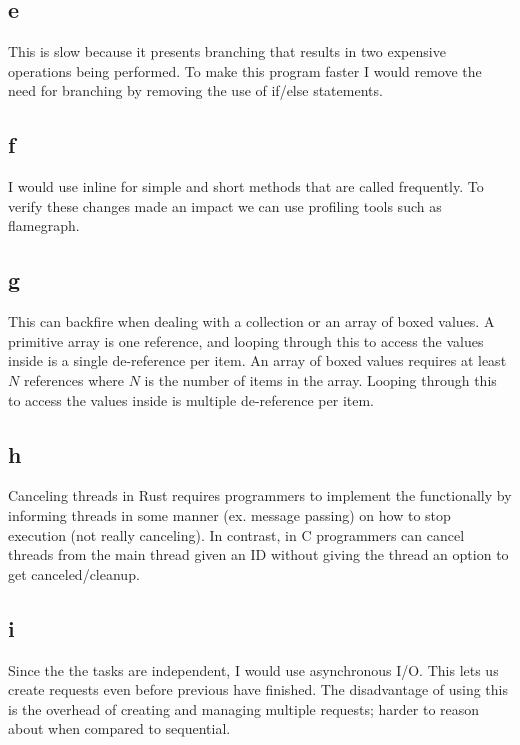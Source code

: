 \documentclass[12pt]{article}
\begin{document}
\subsection{e}
This is slow because it presents branching that results in two expensive operations being performed.
To make this program faster I would remove the need for branching by removing the use of if/else statements.

\subsection{f}
I would use inline for simple and short methods that are called frequently.
To verify these changes made an impact we can use profiling tools such as flamegraph.

\subsection{g}
This can backfire when dealing with a collection or an array of boxed values.
A primitive array is one reference, and looping through this to access the values inside is a single de-reference per item.
An array of boxed values requires at least $N$ references where $N$ is the number of items in the array.
Looping through this to access the values inside is multiple de-reference per item.

\subsection{h}
Canceling threads in Rust requires programmers to implement the functionally by informing threads in some manner (ex. message passing) on how to stop execution (not really canceling).
In contrast, in C programmers can cancel threads from the main thread given an ID without giving the thread an option to get canceled/cleanup.

\subsection{i}
Since the the tasks are independent, I would use asynchronous I/O.
This lets us create requests even before previous have finished.
The disadvantage of using this is the overhead of creating and managing multiple requests; harder to reason about when compared to sequential.
\end{document}
